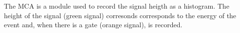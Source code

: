 The MCA is a module used to record the signal heigth as a histogram. The height of the signal (green signal) corresonds corresponds to the energy of the event and, when there is a gate (orange signal), is recorded.


